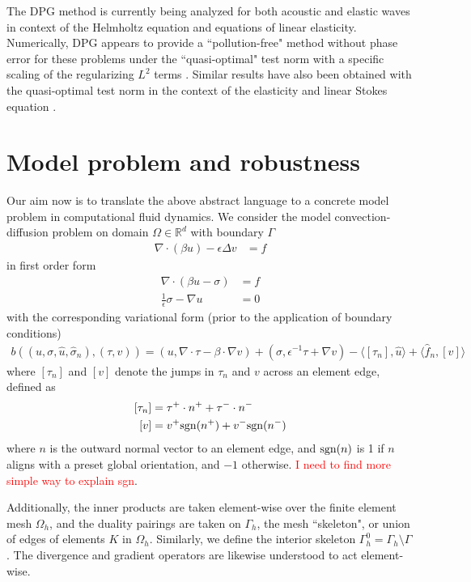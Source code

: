 \documentclass[11pt,onecolumn]{scrartcl}
\newcommand{\grad}{\nabla}
\renewcommand{\div}{\grad \cdot}
\begin{document}
The DPG method is currently being analyzed for both acoustic and elastic waves in context of the Helmholtz equation and equations of linear elasticity.  Numerically, DPG appears to provide a ``pollution-free" method without phase error for these problems under the ``quasi-optimal" test norm with a specific scaling of the regularizing $L^2$ terms \cite{DPG4}. Similar results have also been obtained with the quasi-optimal test norm in the context of the elasticity \cite{DPGElas} and linear Stokes equation \cite{Camellia}. 

\section{Model problem and robustness}

Our aim now is to translate the above abstract language to a concrete model problem in computational fluid dynamics.  We consider the model convection-diffusion problem on domain $\Omega \in \mathbb{R}^d$ with boundary $\Gamma$
\begin{align}
\div (\beta u) - \epsilon\Delta v &= f  \label{primal}
\end{align}
in first order form
\begin{align*}
\div (\beta u - \sigma) &= f  \\
\frac{1}{\epsilon}\sigma - \grad u &= 0
\end{align*}
with the corresponding variational form (prior to the application of boundary conditions)
\begin{align*}
b\left(\left(u,\sigma, \widehat{u}, \widehat{\sigma}_n\right), \left(\tau, v\right)\right) = \left(u,\div \tau - \beta \cdot \grad v\right) + \left(\sigma, \epsilon^{-1} \tau + \grad v\right) - \langle \left[\tau_n\right], \widehat{u} \rangle + \langle \widehat{f}_n, \left[v\right] \rangle 
\end{align*}
where $\left[ \tau_n \right]$ and $\left[ v\right]$ denote the jumps in $\tau_n$ and $v$ across an element edge, defined as
\begin{align*}
\left[ \tau_n \right] &= \tau^+ \cdot n^+ + \tau^-\cdot n^-\\
\left[ v\right] &= v^+{\rm sgn}(n^+) + v^-{\rm sgn}(n^-)
\end{align*}
where $n$ is the outward normal vector to an element edge, and ${\rm sgn}(n)$ is 1 if $n$ aligns with a preset global orientation, and $-1$ otherwise. \textcolor{red}{I need to find more simple way to explain sgn}.

Additionally, the inner products are taken element-wise over the finite element mesh $\Omega_h$, and the duality pairings are taken on $\Gamma_h$, the mesh ``skeleton", or union of edges of elements $K$ in $\Omega_h$.  Similarly, we define the interior skeleton $\Gamma_h^0 = \Gamma_h \setminus \Gamma$. The divergence and gradient operators are likewise understood to act element-wise. 
\end{document}
